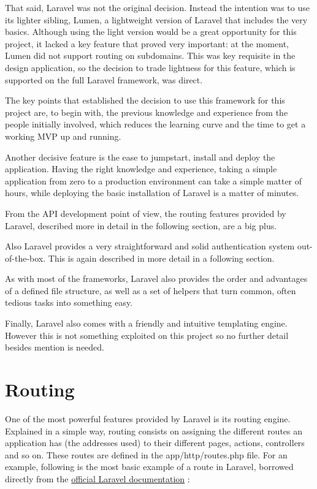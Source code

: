 That said, Laravel was not the original decision. Instead the intention was to use its lighter sibling, Lumen, a lightweight version of Laravel that includes the very basics. Although using the light version would be a great opportunity for this project, it lacked a key feature that proved very important: at the moment, Lumen did not support routing on subdomains. This was key requisite in the design application, so the decision to trade lightness for this feature, which is supported on the full Laravel framework, was direct.

The key points that established the decision to use this framework for this project are, to begin with, the previous knowledge and experience from the people initially involved, which reduces the learning curve and the time to get a working MVP up and running.

Another decisive feature is the ease to jumpstart, install and deploy the application. Having the right knowledge and experience, taking a simple application from zero to a production environment can take a simple matter of hours, while deploying the basic installation of Laravel is a matter of minutes.

From the API development point of view, the routing features provided by Laravel, described more in detail in the following section, are a big plus.

Also Laravel provides a very straightforward and solid authentication system out-of-the-box. This is again described in more detail in a following section.

As with most of the frameworks, Laravel also provides the order and advantages of a defined file structure, as well as a set of helpers that turn common, often tedious tasks into something easy.

Finally, Laravel also comes with a friendly and intuitive templating engine. However this is not something exploited on this project so no further detail besides mention is needed.

\section{Routing}
One of the most powerful features provided by Laravel is its routing engine. Explained in a simple way, routing consists on assigning the different routes an application has (the addresses used) to their different pages, actions, controllers and so on. These routes are defined in the app/http/routes.php file. For an example, following is the most basic example of a route in Laravel, borrowed directly from the \href{https://laravel.com/docs/5.3/routing}{official Laravel documentation} \cite{11}:

